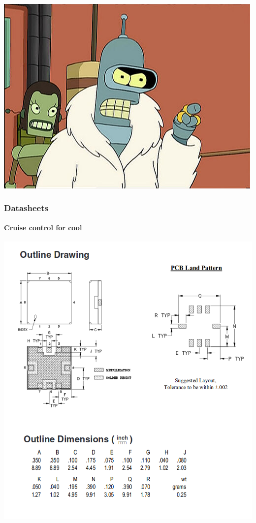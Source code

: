 \documentclass[]{beamer}
\begin{document}
\begin{frame}[plain]
    \begin{center}
        \includegraphics[keepaspectratio,scale=0.5]{images/make_my_own.jpg}
    \end{center}
\end{frame}

\begin{frame}
    \frametitle{Datasheets}
    \framesubtitle{Cruise control for cool}
    \begin{center}
        \includegraphics[keepaspectratio,scale=0.25]{images/datasheet_soldermask.png}
    \end{center}
\end{frame}
\end{document}
